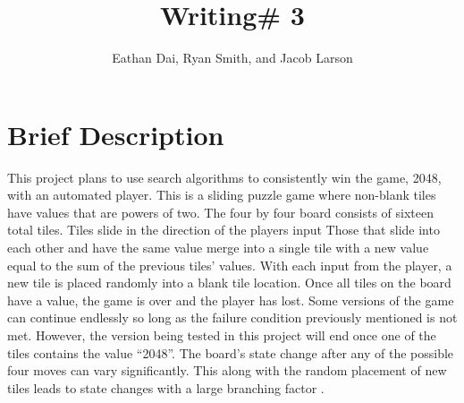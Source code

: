 \documentclass{article}
\title{Writing\# 3}
\author{Eathan Dai, Ryan Smith, and Jacob Larson}
\begin{document}
\maketitle


\section*{Brief Description}
This project plans to use search algorithms to consistently win the game, 2048, with an automated player. This is a sliding puzzle game where non-blank tiles have values that are powers of two. The four by four board consists of sixteen total tiles. Tiles slide in the direction of the players input Those that slide into each other and have the same value merge into a single tile with a new value equal to the sum of the previous tiles’ values. With each input from the player, a new tile is placed randomly into a blank tile location. Once all tiles on the board have a value, the game is over and the player has lost. Some versions of the game can continue endlessly so long as the failure condition previously mentioned is not met. However, the version being tested in this project will end once one of the tiles contains the value “2048”. The board’s state change after any of the possible four moves can vary significantly. This along with the random placement of new tiles leads to state changes with a large branching factor \cite{pot_milivojević_Obradović}. 
\end{document}
